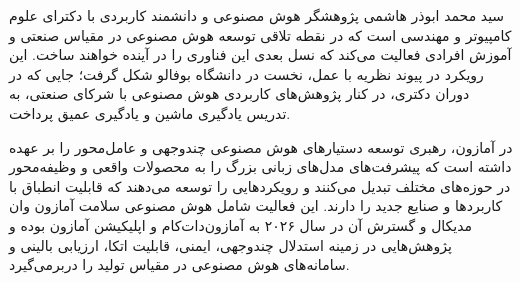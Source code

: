
سید محمد ابوذر هاشمی پژوهشگر هوش مصنوعی و دانشمند کاربردی با دکترای علوم کامپیوتر و مهندسی است که در نقطه تلاقی توسعه هوش مصنوعی در مقیاس صنعتی و آموزش افرادی فعالیت می‌کند که نسل بعدی این فناوری را در آینده خواهند ساخت. این رویکرد در پیوند نظریه با عمل، نخست در دانشگاه بوفالو شکل گرفت؛ جایی که در دوران دکتری، در کنار پژوهش‌های کاربردی هوش مصنوعی با شرکای صنعتی، به تدریس یادگیری ماشین و یادگیری عمیق پرداخت.

در آمازون، رهبری توسعه دستیارهای هوش مصنوعی چندوجهی و عامل‌محور را بر عهده داشته است که پیشرفت‌های مدل‌های زبانی بزرگ را به محصولات واقعی و وظیفه‌محور در حوزه‌های مختلف تبدیل می‌کنند و رویکردهایی را توسعه می‌دهند که قابلیت انطباق با کاربردها و صنایع جدید را دارند. این فعالیت شامل هوش مصنوعی سلامت آمازون وان مدیکال و گسترش آن در سال ۲۰۲۶ به آمازون‌دات‌کام و اپلیکیشن آمازون بوده و پژوهش‌هایی در زمینه استدلال چندوجهی، ایمنی، قابلیت اتکا، ارزیابی بالینی و سامانه‌های هوش مصنوعی در مقیاس تولید را دربرمی‌گیرد.